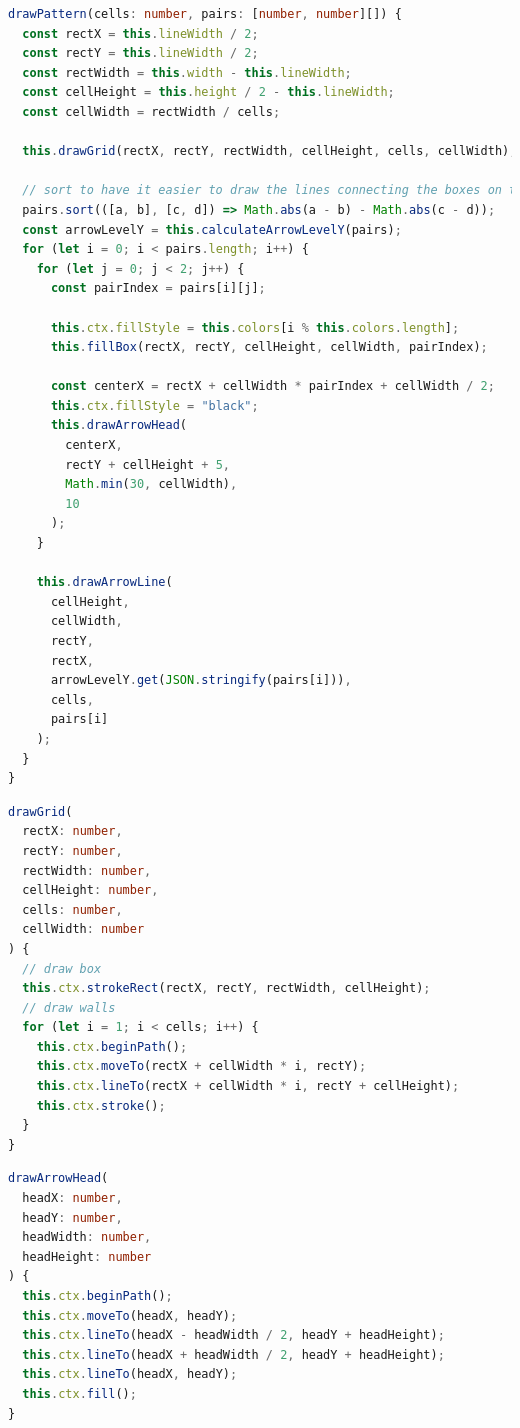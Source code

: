 \begin{lstlisting}[language=TypeScript,caption={Implementation to draw the pattern on a canvas element},label={lst:drawPattern}]
drawPattern(cells: number, pairs: [number, number][]) {
  const rectX = this.lineWidth / 2;
  const rectY = this.lineWidth / 2;
  const rectWidth = this.width - this.lineWidth;
  const cellHeight = this.height / 2 - this.lineWidth;
  const cellWidth = rectWidth / cells;

  this.drawGrid(rectX, rectY, rectWidth, cellHeight, cells, cellWidth);

  // sort to have it easier to draw the lines connecting the boxes on the correct height
  pairs.sort(([a, b], [c, d]) => Math.abs(a - b) - Math.abs(c - d));
  const arrowLevelY = this.calculateArrowLevelY(pairs);
  for (let i = 0; i < pairs.length; i++) {
    for (let j = 0; j < 2; j++) {
      const pairIndex = pairs[i][j];

      this.ctx.fillStyle = this.colors[i % this.colors.length];
      this.fillBox(rectX, rectY, cellHeight, cellWidth, pairIndex);

      const centerX = rectX + cellWidth * pairIndex + cellWidth / 2;
      this.ctx.fillStyle = "black";
      this.drawArrowHead(
        centerX,
        rectY + cellHeight + 5,
        Math.min(30, cellWidth),
        10
      );
    }

    this.drawArrowLine(
      cellHeight,
      cellWidth,
      rectY,
      rectX,
      arrowLevelY.get(JSON.stringify(pairs[i])),
      cells,
      pairs[i]
    );
  }
}
\end{lstlisting}

\begin{lstlisting}[language=TypeScript,caption={},label={lst:drawGrid}]
drawGrid(
  rectX: number,
  rectY: number,
  rectWidth: number,
  cellHeight: number,
  cells: number,
  cellWidth: number
) {
  // draw box
  this.ctx.strokeRect(rectX, rectY, rectWidth, cellHeight);
  // draw walls
  for (let i = 1; i < cells; i++) {
    this.ctx.beginPath();
    this.ctx.moveTo(rectX + cellWidth * i, rectY);
    this.ctx.lineTo(rectX + cellWidth * i, rectY + cellHeight);
    this.ctx.stroke();
  }
}
\end{lstlisting}

\begin{lstlisting}[language=TypeScript,caption={},label={lst:drawArrowHead}]
drawArrowHead(
  headX: number,
  headY: number,
  headWidth: number,
  headHeight: number
) {
  this.ctx.beginPath();
  this.ctx.moveTo(headX, headY);
  this.ctx.lineTo(headX - headWidth / 2, headY + headHeight);
  this.ctx.lineTo(headX + headWidth / 2, headY + headHeight);
  this.ctx.lineTo(headX, headY);
  this.ctx.fill();
}
\end{lstlisting}

